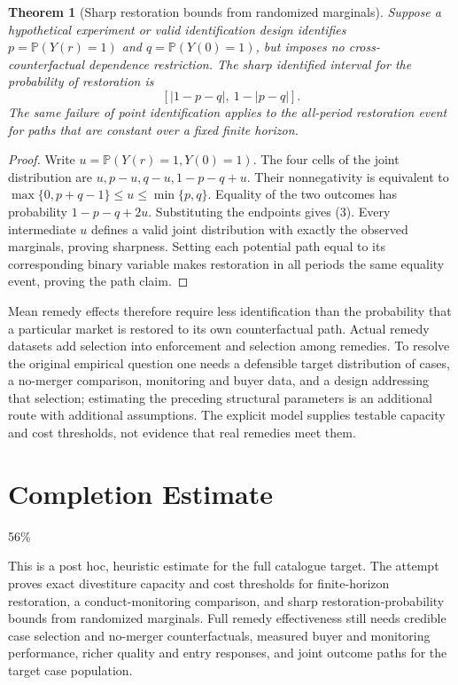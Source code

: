 \documentclass[11pt]{article}
\newtheorem{theorem}{Theorem}
\theoremstyle{remark}\newtheorem{remark}[theorem]{Remark}
\newcommand{\Prb}{\mathbb P}
\begin{document}
\begin{theorem}[Sharp restoration bounds from randomized marginals]
Suppose a hypothetical experiment or valid identification design identifies $p=\Prb(Y(r)=1)$ and $q=\Prb(Y(0)=1)$, but imposes no cross-counterfactual dependence restriction. The sharp identified interval for the probability of restoration is
\[
 \left[|1-p-q|,\ 1-|p-q|\right].
 \tag{3}
\]
The same failure of point identification applies to the all-period restoration event for paths that are constant over a fixed finite horizon.
\end{theorem}
\begin{proof}
Write $u=\Prb(Y(r)=1,Y(0)=1)$. The four cells of the joint distribution are $u,p-u,q-u,1-p-q+u$. Their nonnegativity is equivalent to
$\max\{0,p+q-1\}\le u\le\min\{p,q\}$. Equality of the two outcomes has probability $1-p-q+2u$. Substituting the endpoints gives (3). Every intermediate $u$ defines a valid joint distribution with exactly the observed marginals, proving sharpness. Setting each potential path equal to its corresponding binary variable makes restoration in all periods the same equality event, proving the path claim.
\end{proof}

Mean remedy effects therefore require less identification than the probability that a particular market is restored to its own counterfactual path. Actual remedy datasets add selection into enforcement and selection among remedies. To resolve the original empirical question one needs a defensible target distribution of cases, a no-merger comparison, monitoring and buyer data, and a design addressing that selection; estimating the preceding structural parameters is an additional route with additional assumptions. The explicit model supplies testable capacity and cost thresholds, not evidence that real remedies meet them.

\section{Completion Estimate}
56\%

This is a post hoc, heuristic estimate for the full catalogue target.
The attempt proves exact divestiture capacity and cost thresholds for finite-horizon restoration, a conduct-monitoring comparison, and sharp restoration-probability bounds from randomized marginals. Full remedy effectiveness still needs credible case selection and no-merger counterfactuals, measured buyer and monitoring performance, richer quality and entry responses, and joint outcome paths for the target case population.
\end{document}
